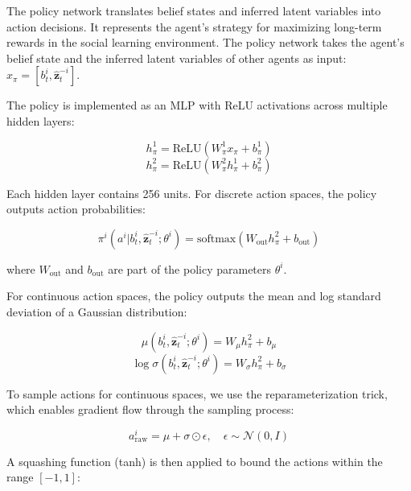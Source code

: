 The policy network translates belief states and inferred latent variables into action decisions. It represents the agent's strategy for maximizing long-term rewards in the social learning environment. The policy network takes the agent's belief state and the inferred latent variables of other agents as input: $x_{\pi} = [b^{i}_{t}, \hat{\boldsymbol{z}}^{-i}_{t}]$.

The policy is implemented as an MLP with ReLU activations across multiple hidden layers:

\begin{equation}
    h^1_{\pi} = \text{ReLU}(W^1_{\pi}x_{\pi} + b^1_{\pi})
\end{equation}
\begin{equation}
    h^2_{\pi} = \text{ReLU}(W^2_{\pi}h^1_{\pi} + b^2_{\pi})
\end{equation}

Each hidden layer contains 256 units. For discrete action spaces, the policy outputs action probabilities:

\begin{equation}
    \pi^{i}(a^{i}|b^{i}_{t}, \hat{\boldsymbol{z}}^{-i}_{t}; \theta^{i}) = \text{softmax}(W_{\text{out}}h^2_{\pi} + b_{\text{out}})
\end{equation}

where $W_{\text{out}}$ and $b_{\text{out}}$ are part of the policy parameters $\theta^{i}$.

For continuous action spaces, the policy outputs the mean and log standard deviation of a Gaussian distribution:

\begin{equation}
    \mu(b^{i}_{t}, \hat{\boldsymbol{z}}^{-i}_{t}; \theta^{i}) = W_{\mu}h^2_{\pi} + b_{\mu}
\end{equation}
\begin{equation}
    \log\sigma(b^{i}_{t}, \hat{\boldsymbol{z}}^{-i}_{t}; \theta^{i}) = W_{\sigma}h^2_{\pi} + b_{\sigma}
\end{equation}

To sample actions for continuous spaces, we use the reparameterization trick, which enables gradient flow through the sampling process:

\begin{equation}
    a^i_{\text{raw}} = \mu + \sigma \odot \epsilon, \quad \epsilon \sim \mathcal{N}(0, I)
\end{equation}

A squashing function (tanh) is then applied to bound the actions within the range $[-1, 1]$:

